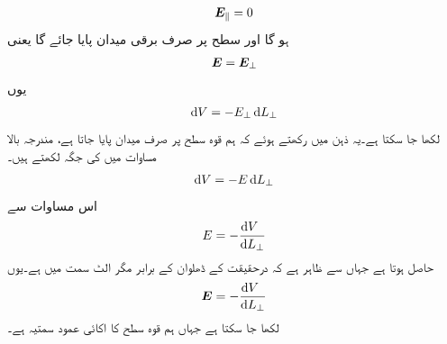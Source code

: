 \begin{align}
{\ensuremath{{\boldsymbol{E}}}}_\parallel=0
\end{align}
ہو گا اور سطح پر صرف       برقی میدان پایا جائے گا یعنی
\begin{align}
{\ensuremath{{\boldsymbol{E}}}}={{\boldsymbol{E}}}_\perp
\end{align}
یوں
\begin{align}
\dif V=-E_\perp \dif L_\perp
\end{align}  
لکھا جا سکتا ہے۔یہ ذہن میں رکھتے ہوئے کہ ہم قوہ سطح پر صرف    میدان پایا جاتا ہے، مندرجہ بالا مساوات میں  کی جگہ  لکھتے ہیں۔
\begin{align}
\dif V=-E \dif L_\perp
\end{align}
اس مساوات سے
\begin{align}
E=-\frac{\dif V_{\phantom{\perp}}}{\dif L_\perp}
\end{align}
حاصل ہوتا ہے جہاں سے ظاہر ہے کہ  درحقیقت  کے ڈھلوان کے برابر مگر الٹ سمت میں ہے۔یوں
\begin{align}
\kvec{E}=-\frac{\dif V_{\phantom{\perp}}}{\dif L_\perp} 
\end{align}
لکھا جا سکتا ہے جہاں  ہم قوہ سطح کا  اکائی  عمود سمتیہ ہے۔


